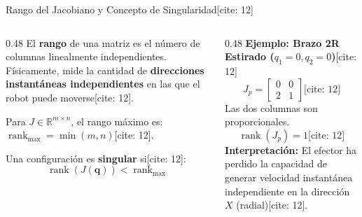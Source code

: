 \documentclass[aspectratio=169, xcolor={table,xcdraw}]{beamer}
\begin{document}
\begin{frame}{Rango del Jacobiano y Concepto de Singularidad[cite: 12]}
    \small
    \begin{columns}[T]
        \begin{column}{0.48\textwidth}
            El \textbf{rango} de una matriz es el número de columnas linealmente independientes. Físicamente, mide la cantidad de \textbf{direcciones instantáneas independientes} en las que el robot puede moverse[cite: 12].
            
            \vspace{0.2cm}
            Para $J \in \mathbb{R}^{m \times n}$, el rango máximo es:
            $\operatorname{rank}_{\max} = \min(m,n)$[cite: 12].
            
            \vspace{0.2cm}
            Una configuración es \textbf{singular} si[cite: 12]:
            \begin{equation*}
                \boxed{\operatorname{rank}(J(\mathbf{q})) < \operatorname{rank}_{\max}}
            \end{equation*}
        \end{column}
        \begin{column}{0.48\textwidth}
            \textbf{Ejemplo: Brazo 2R Estirado ($q_1=0, q_2=0$)}[cite: 12]
            \begin{equation*}
                J_p = \begin{bmatrix} 0 & 0 \\ 2 & 1 \end{bmatrix} \text{[cite: 12]}
            \end{equation*}
            Las dos columnas son proporcionales. 
            \begin{equation*}
                \boxed{\operatorname{rank}(J_p) = 1} \text{[cite: 12]}
            \end{equation*}
            \textbf{Interpretación:} El efector ha perdido la capacidad de generar velocidad instantánea independiente en la dirección $X$ (radial)[cite: 12].
        \end{column}
    \end{columns}
\end{frame}
\end{document}
